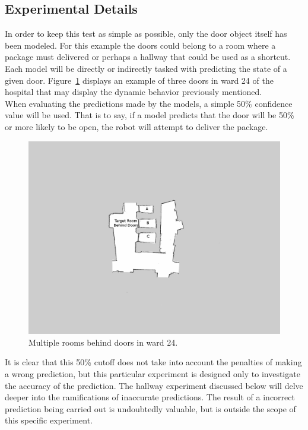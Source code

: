   \subsection{ Experimental Details }

  In order to keep this test as simple as possible, only the door
  object itself has been modeled. For this example the doors could belong to a room where a
  package must delivered or perhaps a hallway that could be used as a
  shortcut. Each model will be directly or indirectly tasked with
  predicting the state of a given door. Figure~\ref{figure:ward_24_door}
  displays an example of three
  doors in ward 24 of the hospital that may display the dynamic behavior
  previously mentioned. \\

  When evaluating the predictions made by the models, a simple 50\% confidence
  value will be used. That is to say, if a model predicts that the door will
  be 50\% or more likely to be open, the robot will attempt to
  deliver the package. \\

  \begin{figure}[!htb]
    \centering
    \includegraphics[width=\linewidth]{images/ward_24_door.png}
    \caption{Multiple rooms behind doors in ward 24.}
    \label{figure:ward_24_door}
  \end{figure}

  It is clear that this 50\% cutoff does not take into account the penalties
  of making a wrong prediction, but this particular experiment is designed only to
  investigate the accuracy of the prediction. The hallway experiment discussed
  below will delve deeper into the ramifications of inaccurate
  predictions. The result of a incorrect prediction
  being carried out is undoubtedly valuable, but is outside the scope of this specific
  experiment. \\

